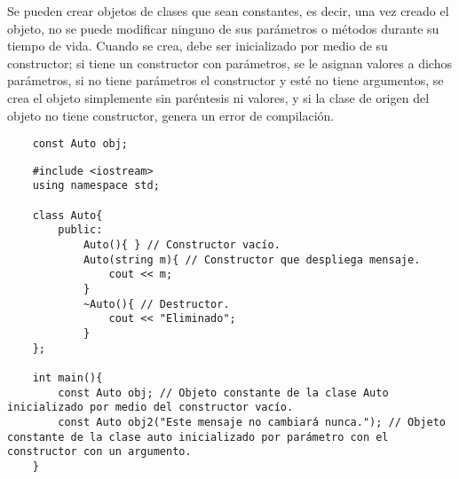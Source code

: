 Se pueden crear objetos de clases que sean constantes, es decir, una vez creado el objeto, no se puede modificar ninguno de sus parámetros o métodos durante su tiempo de vida. Cuando se crea, debe ser inicializado por medio de su constructor; si tiene un constructor con parámetros, se le asignan valores a dichos parámetros, si no tiene parámetros el constructor y esté no tiene argumentos, se crea el objeto simplemente sin paréntesis ni valores, y si la clase de origen del objeto no tiene constructor, genera un error de compilación.
\begin{lstlisting}
    const Auto obj;
\end{lstlisting}
\begin{lstlisting}
    #include <iostream>
    using namespace std;
    
    class Auto{
        public:
            Auto(){ } // Constructor vacío.
            Auto(string m){ // Constructor que despliega mensaje.
                cout << m;
            }
            ~Auto(){ // Destructor.
                cout << "Eliminado";
            }
    };
    
    int main(){
        const Auto obj; // Objeto constante de la clase Auto inicializado por medio del constructor vacío.
        const Auto obj2("Este mensaje no cambiará nunca."); // Objeto constante de la clase auto inicializado por parámetro con el constructor con un argumento.
    }
\end{lstlisting}


